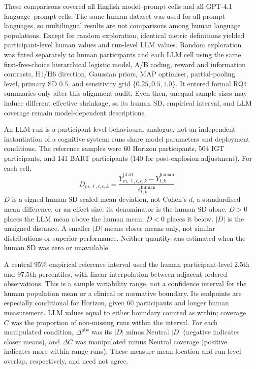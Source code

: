 \documentclass[logo,msc]{infthesis}
\begin{document}
These comparisons covered all English model--prompt cells and all GPT-4.1 language--prompt cells. The same human dataset was used for all prompt languages, so multilingual results are not comparisons among human language populations. Except for random exploration, identical metric definitions yielded participant-level human values and run-level LLM values. Random exploration was fitted separately to human participants and each LLM cell using the same first-free-choice hierarchical logistic model, A/B coding, reward and information contrasts, H1/H6 direction, Gaussian priors, MAP optimiser, partial-pooling level, primary SD 0.5, and sensitivity grid $\{0.25,0.5,1.0\}$. It entered formal RQ4 summaries only after this alignment audit. Even then, unequal sample sizes may induce different effective shrinkage, so its human SD, empirical interval, and LLM coverage remain model-dependent descriptions.

An LLM run is a participant-level behavioural analogue, not an independent instantiation of a cognitive system: runs share model parameters and deployment conditions. The reference samples were 60 Horizon participants, 504 IGT participants, and 141 BART participants (140 for post-explosion adjustment). For each cell,
\[
D_{m,\ell,t,c,k}=\frac{\bar Y^{\mathrm{LLM}}_{m,\ell,t,c,k}-\bar Y^{\mathrm{human}}_{t,k}}{s^{\mathrm{human}}_{t,k}}.
\]
$D$ is a signed human-SD-scaled mean deviation, not Cohen's $d$, a standardised mean difference, or an effect size: its denominator is the human SD alone. $D>0$ places the LLM mean above the human mean; $D<0$ places it below. $|D|$ is the unsigned distance. A smaller $|D|$ means closer means only, not similar distributions or superior performance. Neither quantity was estimated when the human SD was zero or unavailable.

A central 95\% empirical reference interval used the human participant-level 2.5th and 97.5th percentiles, with linear interpolation between adjacent ordered observations. This is a sample variability range, not a confidence interval for the human population mean or a clinical or normative boundary. Its endpoints are especially conditional for Horizon, given 60 participants and longer human measurement. LLM values equal to either boundary counted as within; coverage $C$ was the proportion of non-missing runs within the interval. For each manipulated condition, $\Delta^{\mathrm{abs}}$ was its $|D|$ minus Neutral $|D|$ (negative indicates closer means), and $\Delta C$ was manipulated minus Neutral coverage (positive indicates more within-range runs). These measure mean location and run-level overlap, respectively, and need not agree.
\end{document}
